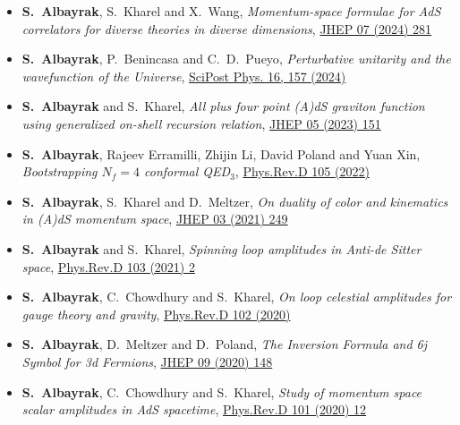\documentclass[a4paper,11pt]{article}
\begin{document}
 \begin{itemize}%
  	 \item[] {\bf S.~Albayrak}, {S.~Kharel} and {X.~Wang}, \emph{Momentum-space formulae for AdS correlators for diverse theories in diverse dimensions}, \hyperref{https://inspirehep.net/literature/2729950}{}{}{JHEP 07 (2024) 281} 
 
  	 \item[] {\bf S.~Albayrak}, {P.~Benincasa} and {C.~D.~Pueyo}, \emph{Perturbative unitarity and the wavefunction of the Universe}, \hyperref{https://doi.org/10.21468/SciPostPhys.16.6.157}{}{}{SciPost Phys. 16, 157 (2024)} 
  	 
 	 \item[] {\bf S.~Albayrak} and  { S.~Kharel}, \emph{All plus four point (A)dS graviton function using generalized on-shell recursion relation}, \hyperref{https://inspirehep.net/literature/2634747}{}{}{JHEP 05 (2023) 151} 
 	
  	\item[] {\bf S.~Albayrak}, Rajeev Erramilli, Zhijin Li, David Poland  and Yuan Xin, \emph{Bootstrapping $N_f=4$ conformal QED$_3$}, \hyperref{https://inspirehep.net/literature/1984752}{}{}{Phys.Rev.D 105 (2022)}
 	
  	\item[] {\bf S.~Albayrak}, { S.~Kharel} and {D.~Meltzer}, \emph{On duality of color and kinematics in (A)dS momentum space}, \hyperref{https://inspirehep.net/literature/1837623}{}{}{JHEP 03 (2021) 249}
 
 \item[] {\bf S.~Albayrak} and  { S.~Kharel}, \emph{Spinning loop amplitudes in Anti-de Sitter space}, \hyperref{https://inspirehep.net/literature/1802534}{}{}{Phys.Rev.D 103 (2021) 2} 
 
 \item[] {\bf S.~Albayrak}, C.~Chowdhury and  { S.~Kharel}, \emph{On loop celestial amplitudes for gauge theory and gravity}, \hyperref{https://inspirehep.net/literature/1807927}{}{}{ Phys.Rev.D 102 (2020)}
 	
 
 \item[] {\bf S.~Albayrak}, D.~Meltzer and  { D.~Poland}, \emph{The Inversion Formula and 6j Symbol for 3d Fermions}, \hyperref{https://inspirehep.net/files/ff4743ee85b68ab8565052dbd4928f62}{}{}{JHEP 09 (2020) 148}
 
 \item[] {\bf S.~Albayrak}, C.~Chowdhury and  { S.~Kharel}, \emph{Study of momentum space scalar amplitudes in AdS spacetime}, \hyperref{https://inspirehep.net/files/950d888f8dbaf39b96ea1bee25d6bda0}{}{}{Phys.Rev.D 101 (2020) 12}
 

\end{itemize}
\end{document}

